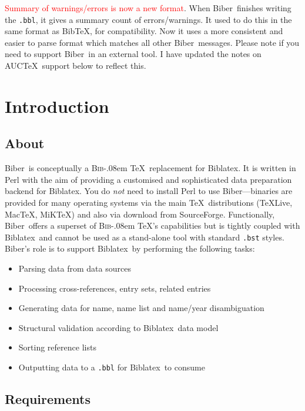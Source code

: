 \documentclass{ltxdockit}
\def\BibTeX{\textsc{Bib}\kern-.08em \TeX}
\newcommand*{\biber}{Biber\xspace}
\newcommand*{\biblatex}{Biblatex\xspace}
\begin{document}
\noindent \textcolor{red}{Summary of warnings/errors is now a new format}.
When \biber\ finishes writing the \verb+.bbl+, it gives a summary
count of errors/warnings. It used to do this in the same format as
Bib\TeX, for compatibility. Now it uses a more consistent and easier
to parse format which matches all other \biber\ messages. Please note
if you need to support \biber\ in an external tool. I have updated the
notes on AUC\TeX\ support below to reflect this.

\section{Introduction}\label{int}

\subsection{About}

\biber\ is conceptually a \BibTeX\ replacement for
\biblatex. It is written in Perl with the aim of providing a
customised and sophisticated data preparation backend for \biblatex.
You do \emph{not} need to install Perl to use \biber---binaries
are provided for many operating systems via the main \TeX\
distributions (\TeX Live, Mac\TeX, MiK\TeX) and also via download from SourceForge.
Functionally, \biber\ offers a superset of \BibTeX's capabilities but is
tightly coupled with \biblatex\ and cannot be used as a stand-alone tool
with standard \verb+.bst+ styles. \biber's role is to support
\biblatex\ by performing the following tasks:

\begin{itemize}
\item Parsing data from data sources
\item Processing cross-references, entry sets, related entries
\item Generating data for name, name list and name/year disambiguation
\item Structural validation according to \biblatex\ data model
\item Sorting reference lists
\item Outputting data to a \verb+.bbl+ for \biblatex\ to consume
\end{itemize}

\subsection{Requirements}\label{ref:req}
\end{document}
